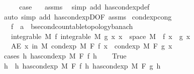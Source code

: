 \begin{isabellebody}
\ \ \isamarkupfalse%
\ \isamarkupfalse%
\ {\isacharquery}{\kern0pt}case\ \isamarkupfalse%
\ {}\ assms{\isacharparenleft}{\kern0pt}{}{\isacharparenright}{\kern0pt}\ \isamarkupfalse%
\ {\isacharparenleft}{\kern0pt}simp\ add{\isacharcolon}{\kern0pt}\ has{\isacharunderscore}{\kern0pt}cond{\isacharunderscore}{\kern0pt}exp{\isacharunderscore}{\kern0pt}def{\isacharparenright}{\kern0pt}\isanewline
{}\isamarkupfalse%
\ {\isacharparenleft}{\kern0pt}auto\ simp\ add{\isacharcolon}{\kern0pt}\ has{\isacharunderscore}{\kern0pt}cond{\isacharunderscore}{\kern0pt}expD{\isacharbrackleft}{\kern0pt}OF\ assms{\isacharparenleft}{\kern0pt}{}{\isacharparenright}{\kern0pt}{\isacharbrackright}{\kern0pt}{\isacharparenright}{\kern0pt}%
\endisatagproof
{\isafoldproof}%
%
\isadelimproof
\isanewline
%
\endisadelimproof
\isanewline
{}\isamarkupfalse%
\ cond{\isacharunderscore}{\kern0pt}exp{\isacharunderscore}{\kern0pt}cong{\isacharcolon}{\kern0pt}\isanewline
\ \ \ f\ {\isacharcolon}{\kern0pt}{\isacharcolon}{\kern0pt}\ {\isachardoublequoteopen}{\isacharprime}{\kern0pt}a\ {\isasymRightarrow}\ {\isacharprime}{\kern0pt}b{\isacharcolon}{\kern0pt}{\isacharcolon}{\kern0pt}{\isacharbraceleft}{\kern0pt}second{\isacharunderscore}{\kern0pt}countable{\isacharunderscore}{\kern0pt}topology{\isacharcomma}{\kern0pt}banach{\isacharbraceright}{\kern0pt}{\isachardoublequoteclose}\isanewline
\ \ \ {\isachardoublequoteopen}integrable\ M\ f{\isachardoublequoteclose}\ {\isachardoublequoteopen}integrable\ M\ g{\isachardoublequoteclose}\ {\isachardoublequoteopen}{\isasymAnd}x{\isachardot}{\kern0pt}\ x\ {\isasymin}\ space\ M\ {\isasymLongrightarrow}\ f\ x\ {\isacharequal}{\kern0pt}\ g\ x{\isachardoublequoteclose}\isanewline
\ \ \ {\isachardoublequoteopen}AE\ x\ in\ M{\isachardot}{\kern0pt}\ cond{\isacharunderscore}{\kern0pt}exp\ M\ F\ f\ x\ {\isacharequal}{\kern0pt}\ cond{\isacharunderscore}{\kern0pt}exp\ M\ F\ g\ x{\isachardoublequoteclose}\isanewline
%
\isadelimproof
%
\endisadelimproof
%
\isatagproof
{}\isamarkupfalse%
\ {\isacharparenleft}{\kern0pt}cases\ {\isachardoublequoteopen}{\isasymexists}h{\isachardot}{\kern0pt}\ has{\isacharunderscore}{\kern0pt}cond{\isacharunderscore}{\kern0pt}exp\ M\ F\ f\ h{\isachardoublequoteclose}{\isacharparenright}{\kern0pt}\isanewline
\ \ \isamarkupfalse%
\ True\isanewline
\ \ \isamarkupfalse%
\ \isamarkupfalse%
\ h\ \ h{\isacharcolon}{\kern0pt}\ {\isachardoublequoteopen}has{\isacharunderscore}{\kern0pt}cond{\isacharunderscore}{\kern0pt}exp\ M\ F\ f\ h{\isachardoublequoteclose}\ {\isachardoublequoteopen}has{\isacharunderscore}{\kern0pt}cond{\isacharunderscore}{\kern0pt}exp\ M\ F\ g\ h{\isachardoublequoteclose}\ \isamarkupfalse%

\end{isabellebody}
